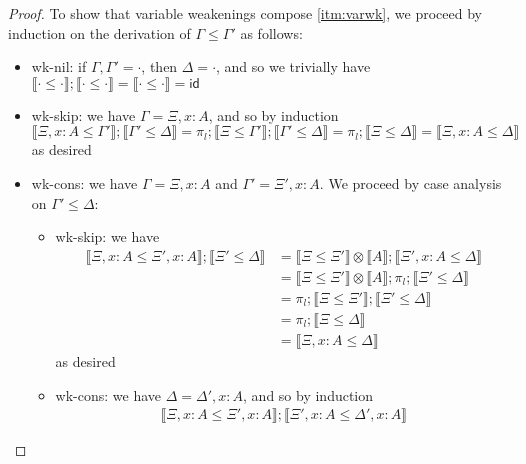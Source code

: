 \documentclass[acmsmall,screen,review]{acmart}
\newcommand{\ms}[1]{\ensuremath{\mathsf{#1}}}
\newcommand{\bhyp}[2]{#1 : #2}
\newcommand{\brle}[1]{{\textsf{#1}}}
\newcommand{\dnt}[1]{\llbracket{#1}\rrbracket}
\begin{document}
\weakeninglem*

\label{proof:weakening}

\begin{proof}
  To show that variable weakenings compose \ref{itm:varwk}, we proceed by induction on the
  derivation of $\Gamma \leq \Gamma'$ as follows:
  \begin{itemize}
    \item \brle{wk-nil}: if $\Gamma, \Gamma' = \cdot$, then $\Delta = \cdot$, and so we trivially
    have $\dnt{\cdot \leq \cdot} ; \dnt{\cdot \leq \cdot} = \dnt{\cdot \leq \cdot} = \ms{id}$
    \item \brle{wk-skip}: we have $\Gamma = \Xi, \bhyp{x}{A}$, and so by induction
    \begin{equation}
      \dnt{\Xi, \bhyp{x}{A} \leq \Gamma'} ; \dnt{\Gamma' \leq \Delta}
      = \pi_l ; \dnt{\Xi \leq \Gamma'} ; \dnt{\Gamma' \leq \Delta}
      = \pi_l ; \dnt{\Xi \leq \Delta}
      = \dnt{\Xi, \bhyp{x}{A} \leq \Delta}
    \end{equation}
    as desired
    \item \brle{wk-cons}: we have $\Gamma = \Xi, \bhyp{x}{A}$ and $\Gamma' = \Xi',
    \bhyp{x}{A}$. We proceed by case analysis on $\Gamma' \leq \Delta$:
    \begin{itemize}
      \item \brle{wk-skip}: we have
      \begin{equation}
        \begin{aligned}
        \dnt{\Xi, \bhyp{x}{A} \leq \Xi', \bhyp{x}{A}} ; \dnt{\Xi' \leq \Delta}
        & = \dnt{\Xi \leq \Xi'} \otimes \dnt{A} ; \dnt{\Xi', \bhyp{x}{A} \leq \Delta} \\
        & = \dnt{\Xi \leq \Xi'} \otimes \dnt{A} ; \pi_l ; \dnt{\Xi' \leq \Delta} \\
        & = \pi_l ; \dnt{\Xi \leq \Xi'} ; \dnt{\Xi' \leq \Delta} \\
        & = \pi_l ; \dnt{\Xi \leq \Delta} \\
        & = \dnt{\Xi, \bhyp{x}{A} \leq \Delta}
        \end{aligned}
      \end{equation}
      as desired
      \item \brle{wk-cons}: we have $\Delta = \Delta' , \bhyp{x}{A}$, and so by induction
      \begin{equation}
        \begin{aligned}
        \dnt{\Xi, \bhyp{x}{A} \leq \Xi', \bhyp{x}{A}} ; 
        \dnt{\Xi', \bhyp{x}{A} \leq \Delta', \bhyp{x}{A}}

\end{aligned}
\end{equation}
\end{itemize}
\end{itemize}
\end{proof}
\end{document}
